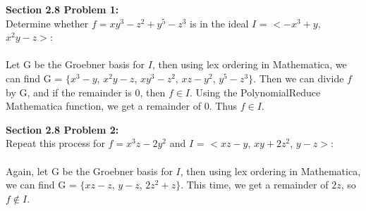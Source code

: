 \documentclass{article}
\newcommand{\separateprobs}{\vspace{.25in}}
\begin{document}
\textbf{Section 2.8 Problem 1: } \\
Determine whether $f = x y^3 - z^2 + y^5 - z^3$ is in the ideal $I$ = $<-x^3 + y$, $x^2 y - z>$:
\\ \\
Let G be the Groebner basis for $I$, then using lex ordering in Mathematica, we can find G = $\{ x^3 - y$, $x^2 y - z$, $x y^3 - z^2$, $x z - y^2$, $y^5 - z^3 \}$.  Then we can divide $f$ by G, and if the remainder is $0$, then $f \in I$.  Using the PolynomialReduce Mathematica function, we get a remainder of $0$. Thus $f \in I$.

\separateprobs
\textbf{Section 2.8 Problem 2: } \\
Repeat this process for $ f = x^3 z - 2y^2$ and $I$ = $<x z - y$, $xy + 2z^2$, $y - z>$:
\\ \\
Again, let G be the Groebner basis for $I$, then using lex ordering in Mathematica, we can find G = 
$\{x z - z$, $y - z$, $2z^2 + z\}$. This time, we get a remainder of $2z$, so $f \notin I$.
\end{document}
